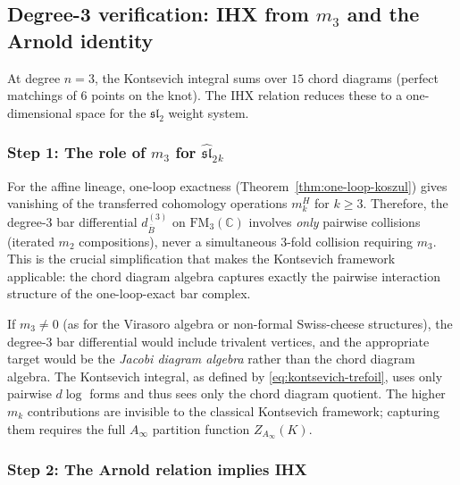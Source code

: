 \documentclass[11pt]{article}
\newcommand{\fsl}{\mathfrak{sl}}
\newcommand{\barB}{\overline{B}}
\newcommand{\C}{\mathbb{C}}
\newcommand{\FM}{\mathrm{FM}}
\begin{document}
\subsection{Degree-3 verification: IHX from $m_3$ and the
Arnold identity}
\label{subsec:degree-3-trefoil}

At degree $n = 3$, the Kontsevich integral sums over $15$
chord diagrams (perfect matchings of $6$ points on the knot).
The IHX relation reduces these to a one-dimensional space for
the $\fsl_2$ weight system.

\subsubsection{Step 1: The role of $m_3$ for $\widehat{\fsl}_2{}_k$}

For the affine lineage, one-loop exactness
(Theorem~\ref{thm:one-loop-koszul}) gives vanishing of the
transferred cohomology operations $m_k^H$ for $k \ge 3$.
Therefore, the degree-$3$ bar differential
$d_{\barB}^{(3)}$ on $\FM_3(\C)$ involves \emph{only} pairwise
collisions (iterated $m_2$ compositions), never a simultaneous
$3$-fold collision requiring $m_3$.  This is the crucial
simplification that makes the Kontsevich framework applicable:
the chord diagram algebra captures exactly the pairwise
interaction structure of the one-loop-exact bar complex.

\begin{remark}
If $m_3 \neq 0$ (as for the Virasoro algebra or non-formal
Swiss-cheese structures), the degree-$3$ bar differential would
include trivalent vertices, and the appropriate target would be
the \emph{Jacobi diagram algebra} rather than the chord diagram
algebra.  The Kontsevich integral, as defined by
\eqref{eq:kontsevich-trefoil}, uses only pairwise $d\log$ forms
and thus sees only the chord diagram quotient.  The higher
$m_k$ contributions are invisible to the classical
Kontsevich framework; capturing them requires the full
$A_\infty$ partition function $Z_{A_\infty}(K)$.
\end{remark}

\subsubsection{Step 2: The Arnold relation implies IHX}
\end{document}
